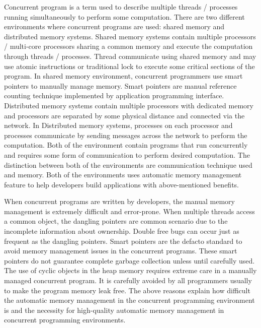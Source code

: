 Concurrent program is a term used to describe multiple threads / processes running simultaneously to perform some computation. There are two different environments where concurrent programs are used: shared memory and distributed memory systems. Shared memory systems contain multiple processors / multi-core processors sharing a common memory and execute the computation through threads / processes. Thread communicate using shared memory and may use atomic instructions or traditional lock to execute some critical sections of the program. 
In shared memory environment, concurrent programmers use smart pointers to manually manage memory. Smart pointers are manual reference counting technique implemented by application programming interface. Distributed memory systems contain multiple processors with dedicated memory and processors are separated by some physical distance and connected via the network. In Distributed memory systems, processes on each processor and processes communicate by sending messages across the network to perform the computation. Both of the environment contain programs that run concurrently and requires some form of communication to perform desired computation. The distinction between both of the environments are communication technique used and memory. Both of the environments uses automatic memory management feature to help developers build applications with above-mentioned benefits. 

When concurrent programs are written by developers, the manual memory management is extremely difficult and error-prone. When multiple threads access a common object, the dangling pointers are common scenario due to the incomplete information about ownership. Double free bugs can occur just as frequent as the dangling pointers. Smart pointers are the defacto standard to avoid memory management issues in the concurrent programs. These smart pointers do not guarantee complete garbage collection unless until carefully used. The use of cyclic objects in the heap memory requires extreme care in a manually managed concurrent program. It is carefully avoided by all programmers usually to make the program memory leak free. The above reasons explain how difficult the automatic memory management in the concurrent programming environment is and the necessity for high-quality automatic memory management in concurrent programming environments. 

